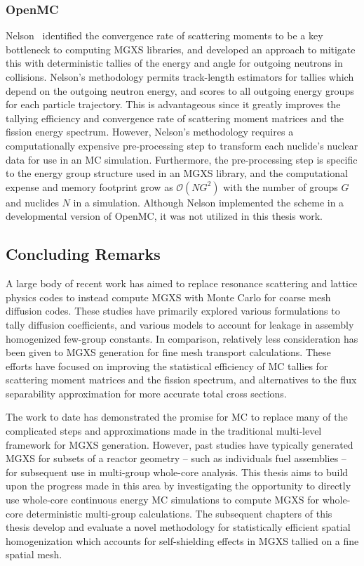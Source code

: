 \subsubsection{OpenMC}
\label{subsec:chap3-lit-review-transport-openmc}

Nelson~\cite{nelson2014improved} identified the convergence rate of scattering moments to be a key bottleneck to computing \ac{MGXS} libraries, and developed an approach to mitigate this with deterministic tallies of the energy and angle for outgoing neutrons in collisions. Nelson's methodology permits track-length estimators for tallies which depend on the outgoing neutron energy, and scores to all outgoing energy groups for each particle trajectory. This is advantageous since it greatly improves the tallying efficiency and convergence rate of scattering moment matrices and the fission energy spectrum. However, Nelson's methodology requires a computationally expensive pre-processing step to transform each nuclide's nuclear data for use in an \ac{MC} simulation. Furthermore, the pre-processing step is specific to the energy group structure used in an \ac{MGXS} library, and the computational expense and memory footprint grow as $\mathcal{O}(NG^{2})$ with the number of groups $G$ and nuclides $N$ in a simulation. Although Nelson implemented the scheme in a developmental version of OpenMC, it was not utilized in this thesis work.

\subsection{Concluding Remarks}
\label{subsec:chap3-lit-review-conclusion}

A large body of recent work has aimed to replace resonance scattering and lattice physics codes to instead compute \ac{MGXS} with Monte Carlo for coarse mesh diffusion codes. These studies have primarily explored various formulations to tally diffusion coefficients, and various models to account for leakage in assembly homogenized few-group constants. In comparison, relatively less consideration has been given to \ac{MGXS} generation for fine mesh transport calculations. These efforts have focused on improving the statistical efficiency of \ac{MC} tallies for scattering moment matrices and the fission spectrum, and alternatives to the flux separability approximation for more accurate total cross sections. 

The work to date has demonstrated the promise for \ac{MC} to replace many of the complicated steps and approximations made in the traditional multi-level framework for \ac{MGXS} generation. However, past studies have typically generated \ac{MGXS} for subsets of a reactor geometry -- such as individuals fuel assemblies -- for subsequent use in multi-group whole-core analysis. This thesis aims to build upon the progress made in this area by investigating the opportunity to directly use whole-core continuous energy \ac{MC} simulations to compute \ac{MGXS} for whole-core deterministic multi-group calculations. The subsequent chapters of this thesis develop and evaluate a novel methodology for statistically efficient spatial homogenization which accounts for self-shielding effects in \ac{MGXS} tallied on a fine spatial mesh.

